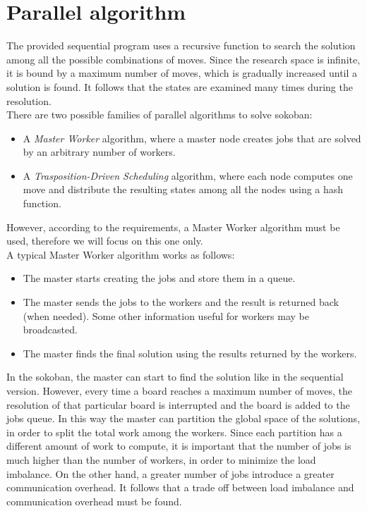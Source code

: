 \documentclass{article}
\begin{document}
\section{Parallel algorithm}
The provided sequential program uses a recursive function to search the solution among all the possible combinations of moves. Since the research space is infinite, it is bound by a maximum number of moves, which is gradually increased until a solution is found. It follows that the states are examined many times during the resolution. \\
There are two possible families of parallel algorithms to solve sokoban:
\begin{itemize}
    \item A \textit{Master Worker} algorithm, where a master node creates jobs that are solved by an arbitrary number of workers.
    \item A \textit{Trasposition-Driven Scheduling} algorithm, where each node computes one move and distribute the resulting states among all the nodes using a hash function.
\end{itemize}
However, according to the requirements, a Master Worker algorithm must be used, therefore we will focus on this one only. \\
A typical Master Worker algorithm works as follows:
\begin{itemize}
    \item The master starts creating the jobs and store them in a queue.
    \item The master sends the jobs to the workers and the result is returned back (when needed). Some other information useful for workers may be broadcasted.
    \item The master finds the final solution using the results returned by the workers.
\end{itemize}
In the sokoban, the master can start to find the solution like in the sequential version. However, every time a board reaches a maximum number of moves, the resolution of that particular board is interrupted and the board is added to the jobs queue. In this way the master can partition the global space of the solutions, in order to split the total work among the workers. Since each partition has a different amount of work to compute, it is important that the number of jobs is much higher than the number of workers, in order to minimize the load imbalance. On the other hand, a greater number of jobs introduce a greater communication overhead. It follows that a trade off between load imbalance and communication overhead must be found. \\
\end{document}
